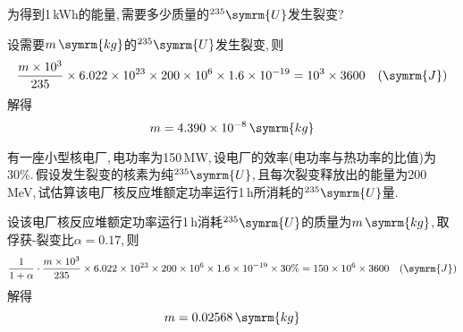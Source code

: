 \begin{exercise}
    为得到1\,kWh的能量,\,需要多少质量的${}^{235}\symrm{U}$发生裂变?
    \begin{solution}
        设需要$m\,\symrm{kg}$的${}^{235}\symrm{U}$发生裂变,\,则
        \begin{equation*}
            \frac{m\times 10^3}{235} \times 6.022 \times 10^{23} \times 200 \times 10^6 \times 1.6 \times 10^{-19} = 10^3 \times 3600 \quad (\symrm{J})
        \end{equation*}
        解得
        \begin{equation*}
            m = 4.390 \times 10^{-8}\,\symrm{kg}
        \end{equation*}
    \end{solution}
\end{exercise}

\begin{exercise}
    有一座小型核电厂,\,电功率为150\,MW,\,设电厂的效率(电功率与热功率的比值)为30\%.\,假设发生裂变的核素为纯${}^{235}\symrm{U}$,\,且每次裂变释放出的能量为200\,MeV,\,试估算该电厂核反应堆额定功率运行1\,h所消耗的${}^{235}\symrm{U}$量.\,
    \begin{solution}
        设该电厂核反应堆额定功率运行1\,h消耗${}^{235}\symrm{U}$的质量为$m\,\symrm{kg}$,\,取俘获-裂变比$\alpha = 0.17$,\,则
        \begin{equation*}
            \frac{1}{1+\alpha} \cdot \frac{m\times 10^3}{235} \times 6.022 \times 10^{23} \times 200 \times 10^6 \times 1.6 \times 10^{-19} \times 30\% = 150 \times 10^6 \times 3600 \quad (\symrm{J})
        \end{equation*}
        解得
        \begin{equation*}
            m = 0.02568\,\symrm{kg}
        \end{equation*}
    \end{solution}
\end{exercise}

